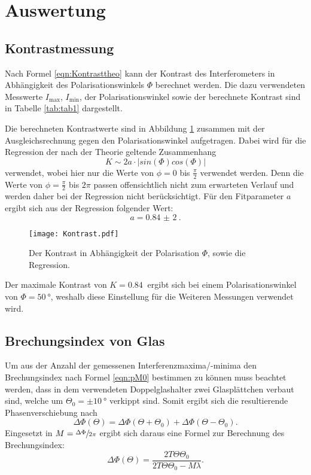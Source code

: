 \section{Auswertung}
\subsection{Kontrastmessung}

Nach Formel \ref{eqn:Kontrasttheo} kann der Kontrast des Interferometers in Abhängigkeit des Polarisationswinkels $\Phi$
berechnet werden. Die dazu verwendeten Messwerte $I_{\text{max}}$, $I_{\text{min}}$, der Polarisationswinkel sowie
der berechnete Kontrast sind in Tabelle \ref{tab:tab1} dargestellt.



Die berechneten Kontrastwerte sind in Abbildung \ref{fig:Kontrast} zusammen mit der Ausgleichsrechnung
gegen den Polarisationswinkel aufgetragen. Dabei wird für die Regression der nach der Theorie geltende Zusammenhang
\begin{equation}
  K\sim 2a\cdot|sin(\Phi)cos(\Phi)|
\end{equation}
verwendet, wobei hier nur die Werte von $\phi=0$ bis $\frac{\pi}{2}$ verwendet werden. Denn die Werte von
$\phi=\frac{\pi}{2}$ bis $2\pi$ passen offensichtlich nicht zum erwarteten Verlauf und werden daher bei der
Regression nicht berücksichtigt.
Für den Fitparameter $a$ ergibt sich aus der Regression folgender Wert:
\begin{equation}
  a=\SI{0,84(2)}{}.
\end{equation}

\begin{figure}[H]
  \centering
  \texttt{[image: Kontrast.pdf]}
  \caption{Der Kontrast in Abhängigkeit der Polarisation $\Phi$, sowie die Regression.}
  \label{fig:Kontrast}
\end{figure}

Der maximale Kontrast von $K=\SI{0,84}{}$ ergibt sich bei einem Polarisationswinkel von $\Phi=\SI{50}{\degree}$,
weshalb diese Einstellung für die Weiteren Messungen verwendet wird.

\subsection{Brechungsindex von Glas}

Um aus der Anzahl der gemessenen Interferenzmaxima/-minima den Brechungsindex nach Formel \ref{eqn:pM0}
bestimmen zu können muss beachtet werden, dass in dem verwendeten Doppelglashalter zwei Glasplättchen verbaut sind,
welche um $\Theta_0=\pm\SI{10}{\degree}$ verkippt sind. Somit ergibt sich die resultierende
Phasenverschiebung nach
\begin{equation}
  \Delta\Phi(\Theta)=\Delta\Phi(\Theta+\Theta_0)+\Delta\Phi(\Theta-\Theta_0).
\end{equation}
Eingesetzt in $M=\sfrac{\Delta\Phi}{2\pi}$ ergibt sich daraus eine Formel zur Berechnung des Brechungsindex:
\begin{equation}
  \Delta\Phi(\Theta)=\frac{2T\Theta\Theta_0}{2T\Theta\Theta_0-M\lambda}.
\end{equation}

